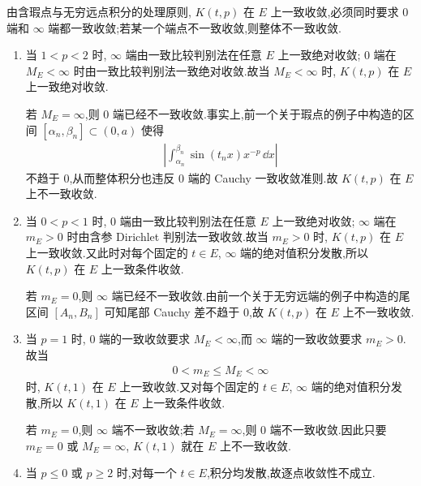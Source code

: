 \begin{exbox}
\begin{enumerate}
		由含瑕点与无穷远点积分的处理原则, $K(t,p)$ 在 $E$ 上一致收敛,必须同时要求 $0$ 端和 $\infty$ 端都一致收敛;若某一个端点不一致收敛,则整体不一致收敛.

		\begin{enumerate}
			\item 当 $1<p<2$ 时, $\infty$ 端由一致比较判别法在任意 $E$ 上一致绝对收敛; $0$ 端在 $M_E<\infty$ 时由一致比较判别法一致绝对收敛.故当 $M_E<\infty$ 时, $K(t,p)$ 在 $E$ 上一致绝对收敛.

			若 $M_E=\infty$,则 $0$ 端已经不一致收敛.事实上,前一个关于瑕点的例子中构造的区间 $[\alpha_n,\beta_n]\subset(0,a)$ 使得
			\begin{align*}
				\left|\int_{\alpha_n}^{\beta_n}\sin(t_nx)x^{-p}\,\dd x\right|
			\end{align*}
			不趋于 $0$,从而整体积分也违反 $0$ 端的 Cauchy 一致收敛准则.故 $K(t,p)$ 在 $E$ 上不一致收敛.

			\item 当 $0<p<1$ 时, $0$ 端由一致比较判别法在任意 $E$ 上一致绝对收敛; $\infty$ 端在 $m_E>0$ 时由含参 Dirichlet 判别法一致收敛.故当 $m_E>0$ 时, $K(t,p)$ 在 $E$ 上一致收敛.又此时对每个固定的 $t\in E$, $\infty$ 端的绝对值积分发散,所以 $K(t,p)$ 在 $E$ 上一致条件收敛.

			若 $m_E=0$,则 $\infty$ 端已经不一致收敛.由前一个关于无穷远端的例子中构造的尾区间 $[A_n,B_n]$ 可知尾部 Cauchy 差不趋于 $0$,故 $K(t,p)$ 在 $E$ 上不一致收敛.

			\item 当 $p=1$ 时, $0$ 端的一致收敛要求 $M_E<\infty$,而 $\infty$ 端的一致收敛要求 $m_E>0$.故当
			\begin{align*}
				0<m_E\leq M_E<\infty
			\end{align*}
			时, $K(t,1)$ 在 $E$ 上一致收敛.又对每个固定的 $t\in E$, $\infty$ 端的绝对值积分发散,所以 $K(t,1)$ 在 $E$ 上一致条件收敛.

			若 $m_E=0$,则 $\infty$ 端不一致收敛;若 $M_E=\infty$,则 $0$ 端不一致收敛.因此只要 $m_E=0$ 或 $M_E=\infty$, $K(t,1)$ 就在 $E$ 上不一致收敛.

			\item 当 $p\leq0$ 或 $p\geq2$ 时,对每一个 $t\in E$,积分均发散,故逐点收敛性不成立.
		\end{enumerate}


\end{enumerate}
\end{exbox}
